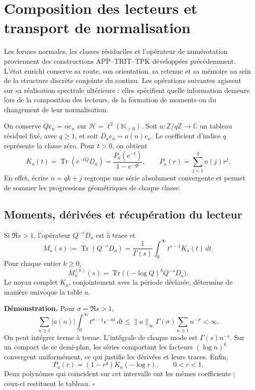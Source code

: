 \section{Composition des lecteurs et transport de normalisation}
\label{ix-add:composicion-lectores}

Les formes normales, les classes résiduelles et l'opérateur de numérotation proviennent des constructions APP--TRIT--TPK développées précédemment. L'état enrichi conserve sa route, son orientation, sa retenue et sa mémoire au sein de la structure discrète conjointe du continu. Les opérations suivantes agissent sur sa réalisation spectrale ultérieure : elles spécifient quelle information demeure lors de la composition des lecteurs, de la formation de moments ou du changement de leur normalisation.

On conserve $Qe_n=ne_n$ sur $\mathcal H=\ell^2(\mathbb N_{>0})$.
Soit $a:\mathbb Z/q\mathbb Z\to\mathbb C$ un tableau résiduel fixé,
avec $q\geq1$, et soit $D_ae_n=a(n)e_n$. Le coefficient d'indice $q$
représente la classe zéro. Pour $t>0$, on obtient
\[
 K_a(t)=\operatorname{Tr}(e^{-tQ}D_a)
 =\frac{P_a(e^{-t})}{1-e^{-qt}},\qquad
 P_a(r)=\sum_{j=1}^{q}a(j)r^j.
\]
En effet, écrire $n=qk+j$ regroupe une série absolument convergente
et permet de sommer les progressions géométriques de chaque classe.

\subsection{Moments, dérivées et récupération du lecteur}
Si $\Re s>1$, l'opérateur $Q^{-s}D_a$ est à trace et
\[
 M_a(s):=\operatorname{Tr}(Q^{-s}D_a)
 =\frac1{\Gamma(s)}\int_0^\infty t^{s-1}K_a(t)\,dt.
\]
Pour chaque entier $k\geq0$,
\[
 M_a^{(k)}(s)=\operatorname{Tr}\bigl((-\log Q)^kQ^{-s}D_a\bigr).
\]
Le noyau complet $K_a$, conjointement avec la période déclarée, détermine
de manière univoque la table $a$.

\textbf{Démonstration.} Pour $\sigma=\Re s>1$,
\[
 \sum_{n\geq1}|a(n)|\int_0^\infty
 t^{\sigma-1}e^{-nt}\,dt
 \leq\|a\|_\infty\Gamma(\sigma)\sum_{n\geq1}n^{-\sigma}<\infty.
\]
On peut intégrer terme à terme. L'intégrale de chaque mode est $\Gamma(s)n^{-s}$. Sur un compact de ce demi-plan, les séries comportant les facteurs $(\log n)^k$ convergent uniformément, ce qui justifie les dérivées et leurs traces. Enfin,
\[
 P_a(r)=(1-r^q)K_a(-\log r),\qquad 0<r<1.
\]
Deux polynômes qui coïncident sur cet intervalle ont les mêmes
coefficients ; ceux-ci restituent le tableau. \hfill$\square$


